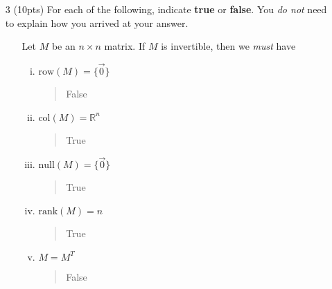 \documentclass{article}
\newcommand{\R}{\mathbb{R}}
\newcommand{\mat}[1]{\begin{bmatrix}#1\end{bmatrix}}
\begin{document}
\begin{enumerate}
\item[3 (10pts)] For each of the following, indicate {\bf true} or {\bf false}.  You {\it do not}
	need to explain how you arrived at your answer.
	\begin{enumerate}
		\item[] Let $M$ be an $n\times n$ matrix.  If $M$ is invertible, then we \emph{must} have
			\begin{enumerate}[(i)]
				\item $\mathrm{row}(M)=\{\vec 0\}$
				\begin{quote}
					False
				\end{quote}
				\vspace{.65in}
				\item $\mathrm{col}(M)=\R^n$
				\begin{quote}
					True
				\end{quote}
				\vspace{.65in}
				\item $\mathrm{null}(M)=\{\vec 0\}$ 
				\begin{quote}
					True
				\end{quote}
				\vspace{.65in}
				\item $\mathrm{rank}(M)=n$
				\begin{quote}
					True
				\end{quote}
				\vspace{.65in}
				\item $M=M^T$ 
				\begin{quote}
					False
				\end{quote}
			\end{enumerate}
	\end{enumerate}
	\pagebreak


\end{enumerate}
\end{document}
